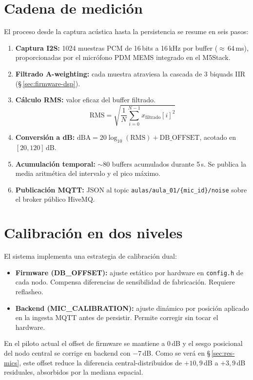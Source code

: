 \documentclass[11pt,a4paper,openany]{report}
\begin{document}
\section{Cadena de medici\'on}

El proceso desde la captura ac\'ustica hasta la persistencia se resume en seis pasos:

\begin{enumerate}
    \item \textbf{Captura I2S:} 1024 muestras PCM de 16\,bits a 16\,kHz por buffer ($\approx$\,64\,ms), proporcionadas por el micr\'ofono PDM MEMS integrado en el M5Stack.
    \item \textbf{Filtrado A-weighting:} cada muestra atraviesa la cascada de 3 biquads IIR (\S\,\ref{sec:firmware-dsp}).
    \item \textbf{C\'alculo RMS:} valor eficaz del buffer filtrado.
    $$\text{RMS} = \sqrt{\frac{1}{N}\sum_{i=0}^{N-1} x_{\text{filtrado}}[i]^2}$$
    \item \textbf{Conversi\'on a dB:} $\text{dBA} = 20 \log_{10}(\text{RMS}) + \text{DB\_OFFSET}$, acotado en $[20, 120]$\,dB.
    \item \textbf{Acumulaci\'on temporal:} $\sim$80 buffers acumulados durante 5\,s. Se publica la media aritm\'etica del intervalo y el pico m\'aximo.
    \item \textbf{Publicaci\'on MQTT:} JSON al topic \texttt{aulas/aula\_01/\{mic\_id\}/noise} sobre el broker p\'ublico HiveMQ.
\end{enumerate}

\section{Calibraci\'on en dos niveles}

El sistema implementa una estrategia de calibraci\'on dual:

\begin{itemize}
    \item \textbf{Firmware (DB\_OFFSET):} ajuste est\'atico por hardware en \texttt{config.h} de cada nodo. Compensa diferencias de sensibilidad de fabricaci\'on. Requiere reflasheo.
    \item \textbf{Backend (MIC\_CALIBRATION):} ajuste din\'amico por posici\'on aplicado en la ingesta MQTT antes de persistir. Permite corregir sin tocar el hardware.
\end{itemize}

En el piloto actual el offset de firmware se mantiene a 0\,dB y el sesgo posicional del nodo central se corrige en backend con $-7$\,dB. Como se ver\'a en \S\,\ref{sec:res-mics}, este offset reduce la diferencia central-distribuidos de \mbox{$+10{,}9$\,dB} a \mbox{$+3{,}9$\,dB} residuales, absorbidos por la mediana espacial.
\end{document}
